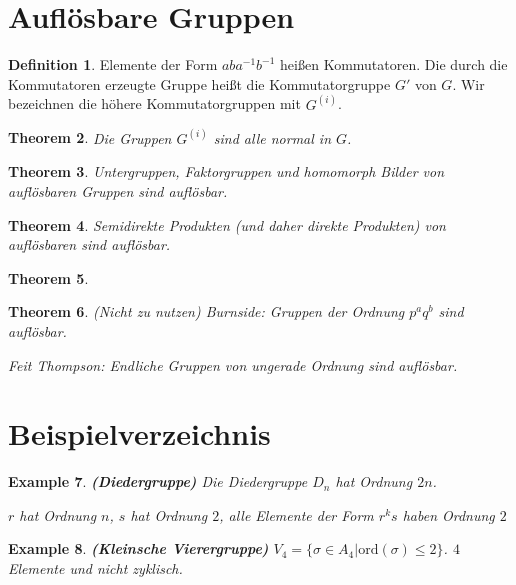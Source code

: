 \documentclass[prb,12pt]{revtex4-2}
\newtheorem{Theorem}{Theorem}
\newtheorem{Example}[Theorem]{Example}
\theoremstyle{definition}
\theoremstyle{definition}
\newtheorem{Definition}[Theorem]{Definition}
\begin{document}
	\section{Auflösbare Gruppen}
	\begin{Definition}
		Elemente der Form $aba^{-1}b^{-1}$ heißen Kommutatoren. Die durch die Kommutatoren erzeugte Gruppe heißt die Kommutatorgruppe $G'$ von $G$. Wir bezeichnen die höhere Kommutatorgruppen mit $G^{(i)}$.
	\end{Definition}
	\begin{Theorem}
		Die Gruppen $G^{(i)}$ sind alle normal in $G$.
	\end{Theorem}
\begin{Theorem}
	Untergruppen, Faktorgruppen und homomorph Bilder von auflösbaren Gruppen sind auflösbar.
\end{Theorem}
\begin{Theorem}
	Semidirekte Produkten (und daher direkte Produkten) von auflösbaren sind auflösbar.
\end{Theorem}
\begin{Theorem}
	
\end{Theorem}
\begin{Theorem}
	(Nicht zu nutzen) Burnside: Gruppen der Ordnung $p^aq^b$ sind auflösbar.

	Feit Thompson: Endliche Gruppen von ungerade Ordnung sind auflösbar.
\end{Theorem}
	\section{Beispielverzeichnis}
	\begin{Example}
		\textbf{(Diedergruppe)} Die Diedergruppe $D_n$ hat Ordnung $2n$. 
		
		$r$ hat Ordnung $n$, $s$ hat Ordnung $2$, alle Elemente der Form $r^k s$ haben Ordnung $2$
	\end{Example}
	\begin{Example}
		\textbf{(Kleinsche Vierergruppe)} $V_4=\{\sigma \in A_4|\text{ord}(\sigma)\le 2\} $. $4$ Elemente und nicht zyklisch.
	\end{Example}
	
\end{document}
